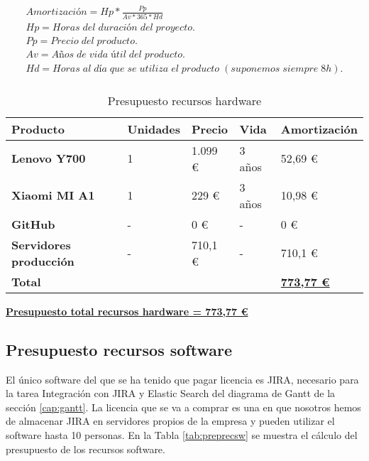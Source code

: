 \label{eq:amortizacion}
\begin{align*}
Amortización = Hp * \frac{Pp}{Av*365*Hd} \\
Hp = Horas \; del \; duración \; del \; proyecto. \\
Pp = Precio \; del \; producto. \\
Av = Años \; de \; vida \; útil \; del \; producto. \\
Hd = Horas \; al \; día \; que \; se \; utiliza \; el \; producto \; (suponemos \; siempre \; 8h). \\
\end{align*}

\begin{table}[H]\label{tab:preprechw}
	\centering
	\begin{tabular}{|l|l|l|l|l|}
		\hline
		\textbf{Producto}               & \textbf{Unidades} & \textbf{Precio} & \textbf{Vida} & \textbf{Amortización} \\ \hline
		\textbf{Lenovo Y700}            & 1                 & 1.099 € \cite{Tfg:ideapad} & 3 años        & 52,69 €               \\ \hline
		\textbf{Xiaomi MI A1}           & 1                 & 229 € \cite{Tfg:mia1}      & 3 años        & 10,98 €               \\ \hline
		\textbf{GitHub}                 & -                 & 0 €             & -             & 0 €                   \\ \hline
		\textbf{Servidores producción}  & -                 & 710,1 €         & -             & 710,1 €               \\ \hline
		\multicolumn{4}{|l|}{\textbf{Total}} & \textbf{\underline{773,77 €}}                                        \\ \hline
	\end{tabular}
	\caption{Presupuesto recursos hardware}
\end{table}

\textbf{\underline{Presupuesto total recursos hardware = 773,77 €}}

\subsection{Presupuesto recursos software}
El único software del que se ha tenido que pagar licencia es JIRA, necesario para la tarea Integración con JIRA y Elastic Search del diagrama de Gantt de la sección \ref{cap:gantt}. La licencia que se va a comprar es una en que nosotros hemos de almacenar JIRA en servidores propios de la empresa y pueden utilizar el software hasta 10 personas. En la Tabla \ref{tab:preprecsw} se muestra el cálculo del presupuesto de los recursos software.

